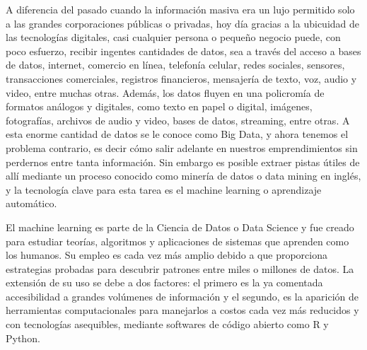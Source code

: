 \documentclass[12pt,]{krantz}
\begin{document}
A diferencia del pasado cuando la información masiva era un lujo permitido solo a las grandes corporaciones públicas o privadas, hoy día gracias a la ubicuidad de las tecnologías digitales, casi cualquier persona o pequeño negocio puede, con poco esfuerzo, recibir ingentes cantidades de datos, sea a través del acceso a bases de datos, internet, comercio en línea, telefonía celular, redes sociales, sensores, transacciones comerciales, registros financieros, mensajería de texto, voz, audio y video, entre muchas otras. Además, los datos fluyen en una policromía de formatos análogos y digitales, como texto en papel o digital, imágenes, fotografías, archivos de audio y video, bases de datos, streaming, entre otras. A esta enorme cantidad de datos se le conoce como Big Data, y ahora tenemos el problema contrario, es decir cómo salir adelante en nuestros emprendimientos sin perdernos entre tanta información. Sin embargo es posible extraer pistas útiles de allí mediante un proceso conocido como minería de datos o data mining en inglés, y la tecnología clave para esta tarea es el machine learning o aprendizaje automático.

El machine learning es parte de la Ciencia de Datos o Data Science y fue creado para estudiar teorías, algoritmos y aplicaciones de sistemas que aprenden como los humanos. Su empleo es cada vez más amplio debido a que proporciona estrategias probadas para descubrir patrones entre miles o millones de datos. La extensión de su uso se debe a dos factores: el primero es la ya comentada accesibilidad a grandes volúmenes de información y el segundo, es la aparición de herramientas computacionales para manejarlos a costos cada vez más reducidos y con tecnologías asequibles, mediante softwares de código abierto como R y Python.
\end{document}
